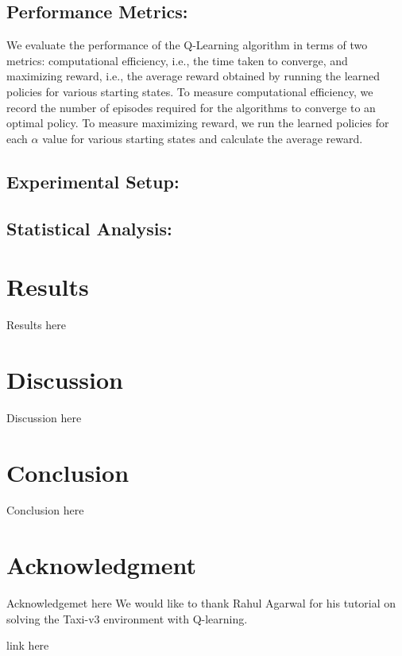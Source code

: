 \documentclass[conference]{IEEEtran}
\begin{document}
\subsection{Performance Metrics:}
We evaluate the performance of the Q-Learning algorithm in terms of two metrics: computational efficiency, i.e., the time taken to converge, and maximizing reward, i.e., the average reward obtained by running the learned policies for various starting states. To measure computational efficiency, we record the number of episodes required for the algorithms to converge to an optimal policy. To measure maximizing reward, we run the learned policies for each $\alpha$ value for various starting states and calculate the average reward. 

\subsection{Experimental Setup:}

\subsection{Statistical Analysis:}


\section{Results}
Results  here

\section{Discussion}
Discussion here

\section{Conclusion}
Conclusion here



\section*{Acknowledgment}
Acknowledgemet here
We would like to thank Rahul Agarwal for his tutorial \cite{agarwal2020} on solving the Taxi-v3 environment with Q-learning.

\begin{thebibliography}{00}
 link here
\end{thebibliography}
\end{document}
